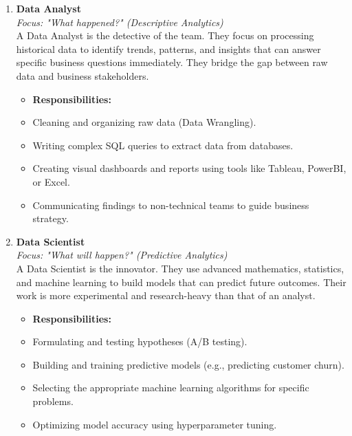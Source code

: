 \documentclass[a4paper,12pt]{article}
\begin{document}
\begin{enumerate}
    \item \textbf{Data Analyst} \\
    \textit{Focus: "What happened?" (Descriptive Analytics)} \\
    A Data Analyst is the detective of the team. They focus on processing historical data to identify trends, patterns, and insights that can answer specific business questions immediately. They bridge the gap between raw data and business stakeholders.
    \begin{itemize}
        \item \textbf{Responsibilities:}
        \item Cleaning and organizing raw data (Data Wrangling).
        \item Writing complex SQL queries to extract data from databases.
        \item Creating visual dashboards and reports using tools like Tableau, PowerBI, or Excel.
        \item Communicating findings to non-technical teams to guide business strategy.
    \end{itemize}

    \item \textbf{Data Scientist} \\
    \textit{Focus: "What will happen?" (Predictive Analytics)} \\
    A Data Scientist is the innovator. They use advanced mathematics, statistics, and machine learning to build models that can predict future outcomes. Their work is more experimental and research-heavy than that of an analyst.
    \begin{itemize}
        \item \textbf{Responsibilities:}
        \item Formulating and testing hypotheses (A/B testing).
        \item Building and training predictive models (e.g., predicting customer churn).
        \item Selecting the appropriate machine learning algorithms for specific problems.
        \item Optimizing model accuracy using hyperparameter tuning.
    \end{itemize}


\end{enumerate}
\end{document}
